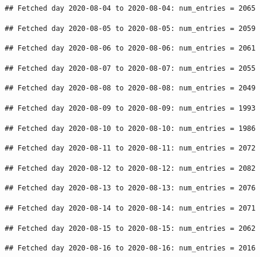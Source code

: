 \documentclass[]{article}
\begin{document}
\begin{verbatim}
## Fetched day 2020-08-04 to 2020-08-04: num_entries = 2065
\end{verbatim}

\begin{verbatim}
## Fetched day 2020-08-05 to 2020-08-05: num_entries = 2059
\end{verbatim}

\begin{verbatim}
## Fetched day 2020-08-06 to 2020-08-06: num_entries = 2061
\end{verbatim}

\begin{verbatim}
## Fetched day 2020-08-07 to 2020-08-07: num_entries = 2055
\end{verbatim}

\begin{verbatim}
## Fetched day 2020-08-08 to 2020-08-08: num_entries = 2049
\end{verbatim}

\begin{verbatim}
## Fetched day 2020-08-09 to 2020-08-09: num_entries = 1993
\end{verbatim}

\begin{verbatim}
## Fetched day 2020-08-10 to 2020-08-10: num_entries = 1986
\end{verbatim}

\begin{verbatim}
## Fetched day 2020-08-11 to 2020-08-11: num_entries = 2072
\end{verbatim}

\begin{verbatim}
## Fetched day 2020-08-12 to 2020-08-12: num_entries = 2082
\end{verbatim}

\begin{verbatim}
## Fetched day 2020-08-13 to 2020-08-13: num_entries = 2076
\end{verbatim}

\begin{verbatim}
## Fetched day 2020-08-14 to 2020-08-14: num_entries = 2071
\end{verbatim}

\begin{verbatim}
## Fetched day 2020-08-15 to 2020-08-15: num_entries = 2062
\end{verbatim}

\begin{verbatim}
## Fetched day 2020-08-16 to 2020-08-16: num_entries = 2016
\end{verbatim}
\end{document}

